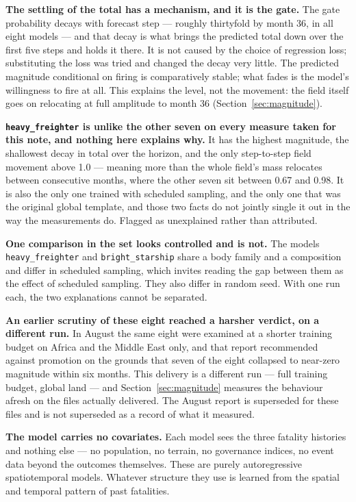 \textbf{The settling of the total has a mechanism, and it is the gate.} The gate probability
decays with forecast step --- roughly thirtyfold by month 36, in all eight models --- and that
decay is what brings the predicted total down over the first five steps and holds it there. It is
not caused by the choice of regression loss; substituting the loss was tried and changed the decay
very little. The predicted magnitude conditional on firing is comparatively stable; what fades is
the model's willingness to fire at all. This explains the level, not the movement: the field itself
goes on relocating at full amplitude to month 36 (Section~\ref{sec:magnitude}).

\textbf{\texttt{heavy\_freighter} is unlike the other seven on every measure taken for this
note, and nothing here explains why.} It has the highest magnitude, the shallowest decay in total
over the horizon, and the only step-to-step field movement above 1.0 --- meaning more than the
whole field's mass relocates between consecutive months, where the other seven sit between 0.67 and
0.98. It is also the only one trained with scheduled sampling, and the only one that was the
original global template, and those two facts do not jointly single it out in the way the
measurements do. Flagged as unexplained rather than attributed.

\textbf{One comparison in the set looks controlled and is not.} The models
\texttt{heavy\_freighter} and \texttt{bright\_starship} share a body family and a composition
and differ in scheduled sampling, which invites reading the gap between them as the effect of
scheduled sampling. They also differ in random seed. With one run each, the two explanations
cannot be separated.

\textbf{An earlier scrutiny of these eight reached a harsher verdict, on a different run.} In
August the same eight were examined at a shorter training budget on Africa and the Middle East
only, and that report recommended against promotion on the grounds that seven of the eight
collapsed to near-zero magnitude within six months. This delivery is a different run --- full
training budget, global land --- and Section~\ref{sec:magnitude} measures the behaviour afresh on
the files actually delivered. The August report is superseded for these files and is not
superseded as a record of what it measured.

\textbf{The model carries no covariates.} Each model sees the three fatality histories and nothing
else --- no population, no terrain, no governance indices, no event data beyond the outcomes
themselves. These are purely autoregressive spatiotemporal models. Whatever structure they use is
learned from the spatial and temporal pattern of past fatalities.
